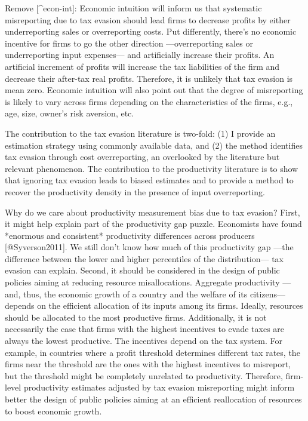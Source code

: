 \documentclass[
  12pt]{article}
\theoremstyle{definition}
\theoremstyle{remark}
\begin{document}
\begin{anfxnote*}{Remove}
[^econ-int]: Economic intuition will inform us that systematic misreporting due to tax evasion should lead firms to decrease profits by either underreporting sales or overreporting costs. Put differently, there's no economic incentive for firms to go the other direction —overreporting sales or underreporting input expenses— and artificially increase their profits. An artificial increment of profits will increase the tax liabilities of the firm and decrease their after-tax real profits. Therefore, it is unlikely that tax evasion is mean zero. Economic intuition will also point out that the degree of misreporting is likely to vary across firms depending on the characteristics of the firms, e.g., age, size, owner's risk aversion, etc.
    
The contribution to the tax evasion literature is two-fold: (1) I provide an estimation strategy using commonly available data, and (2) the method identifies tax evasion through cost overreporting, an overlooked by the literature but relevant phenomenon. The contribution to the productivity literature is to show that ignoring tax evasion leads to biased estimates and to provide a method to recover the productivity density in the presence of input overreporting.

Why do we care about productivity measurement bias due to tax evasion? First, it might help explain part of the productivity gap puzzle. Economists have found *enormous and consistent* productivity differences across producers [@Syverson2011]. We still don't know how much of this productivity gap —the difference between the lower and higher percentiles of the distribution— tax evasion can explain. Second, it should be considered in the design of public policies aiming at reducing resource misallocations. Aggregate productivity —and, thus, the economic growth of a country and the welfare of its citizens— depends on the efficient allocation of its inputs among its firms. Ideally, resources should be allocated to the most productive firms. Additionally, it is not necessarily the case that firms with the highest incentives to evade taxes are always the lowest productive. The incentives depend on the tax system. For example, in countries where a profit threshold determines different tax rates, the firms near the threshold are the ones with the highest incentives to misreport, but the threshold might be completely unrelated to productivity. Therefore, firm-level productivity estimates adjusted by tax evasion misreporting might inform better the design of public policies aiming at an efficient reallocation of resources to boost economic growth.


\end{anfxnote*}
\end{document}
